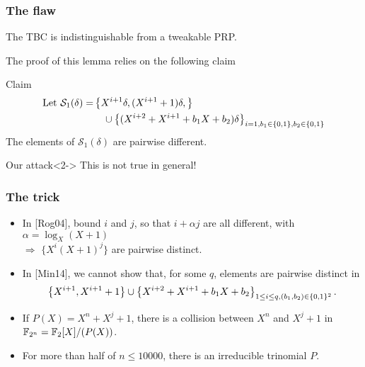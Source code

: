 \documentclass{beamer}
\begin{document}
	\begin{frame}
		\frametitle{The flaw}

		\begin{lemma}[{Lemma 1 of [Min14]}]
			The TBC is indistinguishable from a tweakable PRP.
		\end{lemma}
		The proof of this lemma relies on the following claim
		\begin{block}{Claim}
		\begin{align*}
		\mbox{Let }\mathcal{S}_1(\delta) = & \left\{X^{i+1}\delta, (X^{i+1} +1)\delta,\right\} \\
		 &\ \ \  \cup \left\{ (X^{i+2} + X^{i+1} + b_1 X + b_2)\delta \right\}_{i=1, b_1 \in \{0, 1\}, b_2 \in \{0, 1\}} 
		\end{align*}
		The elements of $\mathcal{S}_1(\delta)$
		are pairwise different.
		\end{block}
	
		\begin{alertblock}{Our attack}<2->
			This is not true in general!
		\end{alertblock}

	\end{frame}

	\begin{frame}
		\frametitle{The trick}

		\begin{itemize}
			\item In [Rog04], bound $i$ and $j$, so that $i + \alpha j$ are all different, with $\alpha = \log_X (X+1)$  
			\\ \tab $\Rightarrow$ $\{X^i (X+1)^j\}$ are pairwise distinct.
			
			\item<2-> In [Min14], we cannot show that, for some $q$, elements are pairwise distinct in 
				\[
				\left\{X^{i+1}, X^{i+1} +1 \right\} \cup \left\{ X^{i+2} + X^{i+1} + b_1 X + b_2\right\}_{1\leq i \leq q, (b_1,b_2) \in \{0, 1\}^2}.
				\]
		
			\item<3-> If $P(X) = X^n + X^j + 1$, there is a collision between $X^n$ and $X^j + 1$ in $\mathbb{F}_{2^n} = \mathbb{F}_2[X]/(P(X))$.
			
			\item<4-> For more than half of $n \leq 10 000$, there is an irreducible trinomial $P$.
		\end{itemize}
	\end{frame}
\end{document}
